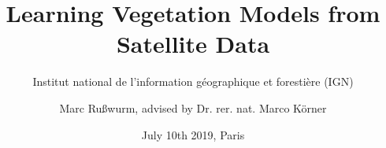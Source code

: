 \documentclass[%
  aspectratio=169,
  9pt,
  USenglish,
  titlegraphic, %
  affiliationintitlepagehead,
  progressbar,
]{beamer}
\title{Learning Vegetation Models from Satellite Data}
\subtitle{Institut national de l'information géographique et forestière (IGN)}
\author[M. Rußwurm]{Marc Rußwurm, advised by Dr. rer. nat. Marco Körner}
\institute[TUM]{Technical University of Munich, Germany\\
                Remote Sensing Technology}
\date{July 10th 2019, Paris}
\begin{document}
\begin{frame}[t]
  \titlepage
\end{frame}

%
%		
%		
\end{document}
